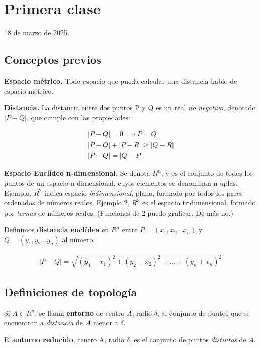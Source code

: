 \section{Primera clase}

18 de marzo de 2025.

\subsection{Conceptos previos}

\textbf{Espacio métrico.}
Todo espacio que pueda calcular una distancia hablo de espacio métrico.

\textbf{Distancia.}
La distancia entre dos puntos P y Q es un real \textit{no negativo},
denotado \(|P-Q|\),
que cumple con las propiedades:

\begin{align*}
    |P-Q| = 0 \implies P = Q \\
    |P-Q| + |P-R| \geq |Q-R| \\
    |P-Q| = |Q-P|  
\end{align*}

\textbf{Espacio Euclídeo n-dimensional.}
Se denota \(R^{n}\),
y es el conjunto de todos los puntos de un espacio n dimensional,
cuyos elementos se denominan n-uplas.
Ejemplo, \(R^{2}\) indica espacio \textit{bidimensional},
plano,
formado por todos los pares ordenados de números reales.
Ejemplo 2, \(R^{3}\) es el espacio tridimensional,
formado por \textit{ternas} de números reales.
(Funciones de 2 puedo graficar.
De más no.)

Definimos \textbf{distancia euclídea} en \(R^{n}\) 
entre \(P = (x_{1},x_2 \dots x_n)\) y \(Q = (y_{1},y_2 \dots y_n)\) al número:

\begin{align*}
    |P-Q| = \sqrt{(y_1 - x_1)^{2} + (y_2 - x_2)^{2} + \dots + (y_n + x_n)^{2}}
\end{align*}

\subsection{Definiciones de topología}

Si \(A \in R^{n}\), 
se llama \textbf{entorno} de centro \(A\),
radio \(\delta\),
al conjunto de puntos que se encuentran a \textit{distancia} de \(A\) menor a \(\delta\).

El \textbf{entorno reducido},
centro A,
radio \(\delta\),
es el conjunto de puntos \textit{distintos} de \(A\).

